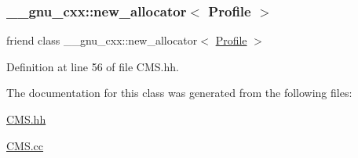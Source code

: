 \subsubsection{\texorpdfstring{\+\_\+\+\_\+gnu\+\_\+cxx\+::new\+\_\+allocator$<$ Profile $>$}{\_\_gnu\_cxx::new\_allocator< Profile >}}
{\footnotesize\ttfamily friend class \+\_\+\+\_\+gnu\+\_\+cxx\+::new\+\_\+allocator$<$ \hyperlink{class_c_m_s_1_1_profile}{Profile} $>$\hspace{0.3cm}{\ttfamily [friend]}}



Definition at line 56 of file C\+M\+S.\+hh.



The documentation for this class was generated from the following files\+:\begin{DoxyCompactItemize}
\item 
\hyperlink{_c_m_s_8hh}{C\+M\+S.\+hh}\item 
\hyperlink{_c_m_s_8cc}{C\+M\+S.\+cc}\end{DoxyCompactItemize}
